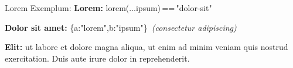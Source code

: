 
\begin{block}{Lorem Exemplum: }
\textbf{Lorem:} {\small\ttfamily lorem(...ipsum)\,==\,"dolor-sit"}

\vspace{0.3em}
\textbf{Dolor sit amet:} {\small\ttfamily \{a:"lorem",b:"ipsum"\}}\, \emph{(consectetur adipiscing)}

\vspace{0.3em}
\textbf{Elit:} ut labore et dolore magna aliqua, ut enim ad minim veniam quis nostrud exercitation. Duis aute irure dolor in reprehenderit.
\end{block}
